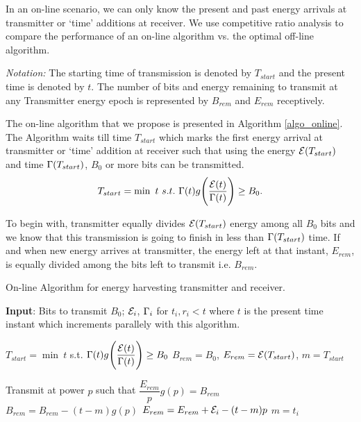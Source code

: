 In an on-line scenario, we can only know the present and past energy arrivals at transmitter or `time' additions at receiver. We use competitive ratio analysis to compare the performance of an on-line algorithm vs. the optimal off-line algorithm.  
 
\textit{Notation:} The starting time of transmission is denoted by $T_{start}$ and the present time is denoted by $t$. The number of bits and energy remaining to transmit at any Transmitter energy epoch is represented by $B_{rem}$ and $E_{rem}$ receptively.

The on-line algorithm that we propose is presented in Algorithm \ref{algo_online}. The Algorithm waits till time $T_{start}$ which marks the first energy arrival at transmitter or `time' addition at receiver such that using the energy $\mathcal{E}(T_{start})$ and time $\Gamma(T_{start})$, $B_0$ or more bits can be transmitted.
\begin{equation}
T_{start}=\min\ t \ s.t.\  \TRx(t)g\Bigg{(} \dfrac{\ETx(t)}{\TRx(t)}\Bigg{)}\ge B_0.\label{online_T_start}
\end{equation}

To begin with, transmitter equally divides $\mathcal{E}(T_{start})$ energy among all $B_0$ bits and we know that this transmission is going to finish in less than $\Gamma(T_{start})$ time. If and when new energy arrives at transmitter, the energy left at that instant, $E_{rem}$, is equally divided among the bits left to transmit i.e. $B_{rem}$.

\begin{algorithm}
\caption {On-line Algorithm for energy harvesting transmitter and receiver.}
\footnotesize
\label{algo_online}
\begin{algorithmic}[1]
\State \textbf{Input}: Bits to transmit $B_0$; $\mathcal{E}_i$, $\Gamma_i$ for $t_i,r_i<t$ where $t$ is the present time instant which increments parallely with this algorithm. 

\State $T_{start}=\min\ t$ s.t. $\Gamma(t)g\Bigg{(} \dfrac{\mathcal{E}(t)}{\Gamma(t)}\Bigg{)}\ge B_0$
\State $B_{rem}=B_0$, $E_{rem}=\mathcal{E}(T_{start})$, $m=T_{start}$

\Do
	\State Transmit at power $p$ such that $\dfrac{E_{rem}}{p} g(p)= B_{rem}$
		\State $B_{rem}=B_{rem}-(t-m)g(p)$
		\State $E_{rem}=E_{rem}+\mathcal{E}_i-(t-m)p$
		\State $m=t_i$
	\EndIf
{}
\end{algorithmic}
\end{algorithm}

